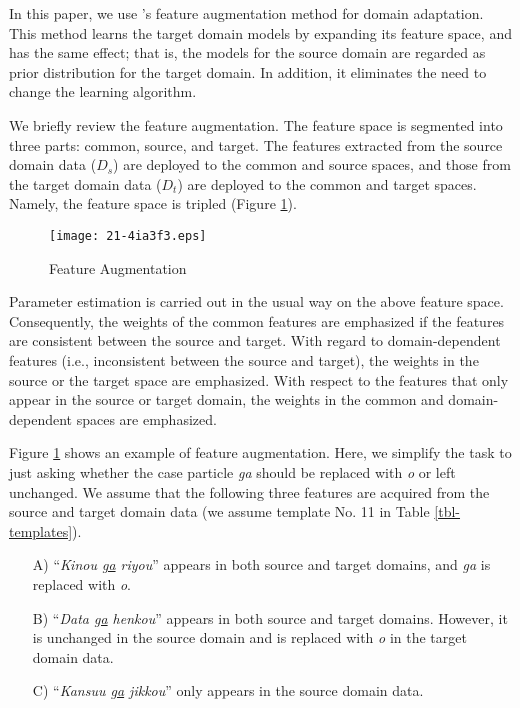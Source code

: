 \documentclass[english]{jnlp_1.4_rep}
\begin{document}
In this paper, we use 's feature
augmentation method for domain adaptation. This method learns the
target domain models by expanding its feature space, and has
the same effect; that is, the models for the source domain are
regarded as prior distribution for the target domain. In addition, it
eliminates the need to change the learning algorithm.


We briefly review the feature augmentation. The feature space is
segmented into three parts: common, source, and target. The features
extracted from the source domain data ($D_s$) are deployed to the
common and source spaces, and those from the target domain data
($D_t$) are deployed to the common and target spaces. Namely, the
feature space is tripled (Figure \ref{fig-augment}).

\begin{figure}[t]
\begin{center}
\texttt{[image: 21-4ia3f3.eps]}
\end{center}
\caption{Feature Augmentation}
\label{fig-augment}
\end{figure}

Parameter estimation is carried out in the usual way on the above
feature space. Consequently, the weights of the common features are
emphasized if the features are consistent between the source and
target. With regard to domain-dependent features (i.e., inconsistent
between the source and target), the weights in the source or the
target space are emphasized. With respect to the features that only
appear in the source or target domain, the weights in the common and
domain-dependent spaces are emphasized.


Figure \ref{fig-augment} shows an example of feature
augmentation. Here, we simplify the task to just asking whether the
case particle \textit{ga} should be replaced with \textit{o} or left
unchanged. We assume that the following three features are acquired
from the source and target domain data (we assume template No. 11 in
Table \ref{tbl-templates}).

\begin{itemize}
\item[A)] ``{\it Kinou \underline{ga} riyou}'' appears in both source
and target domains, and \textit{ga} is replaced with \textit{o}.

\item[B)] ``{\it Data \underline{ga} henkou}'' appears in both
source and target domains.  However, it is unchanged in the source
domain and is replaced with \textit{o} in the target domain data.

\item[C)] ``{\it Kansuu \underline{ga} jikkou}'' only appears in the
source domain data.
\end{itemize}
\end{document}
